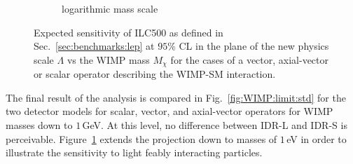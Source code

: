 \begin{figure}[htbp]
\begin{center}
\begin{subfigure}{0.49\hsize}
 \caption{logarithmic mass scale\label{fig:WIMP:limit:lowM}}
 \end{subfigure}
\end{center}
\caption{Expected sensitivity of ILC500 as defined in Sec.~\ref{sec:benchmarks:lep} at $95$\% CL in the plane of the new physics scale $\Lambda$ vs the WIMP mass $M_{\chi}$ for the cases of a vector, axial-vector or scalar operator describing the WIMP-SM interaction.}
\label{fig:WIMP:limit}
\end{figure}

The final result of the analysis is compared in Fig.~\ref{fig:WIMP:limit:std} for the two detector models for scalar, vector, and axial-vector operators for WIMP masses down to $1$\,GeV. At this level, no difference between IDR-L and IDR-S is perceivable. Figure~\ref{fig:WIMP:limit:lowM} extends the projection down to masses of $1$\,eV in order to illustrate the sensitivity to light feably interacting particles.

